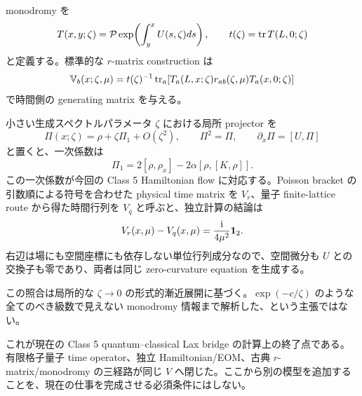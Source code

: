monodromy を
\begin{equation}
T(x,y;\zeta)=\mathcal P\exp\!\left(\int_y^xU(s,\zeta)ds\right),
\qquad t(\zeta)=\operatorname{tr} T(L,0;\zeta)
\label{eq:monodromySTS}
\end{equation}
と定義する。標準的な $r$-matrix construction は
\begin{equation}
\mathbb V_b(x;\zeta,\mu)=t(\zeta)^{-1}\operatorname{tr}_a\!\left[
T_a(L,x;\zeta)r_{ab}(\zeta,\mu)T_a(x,0;\zeta)
\right]
\label{eq:STSformula}
\end{equation}
で時間側の generating matrix を与える\cite{DoikouKaraiskos2011}。

小さい生成スペクトルパラメータ $\zeta$ における局所 projector を
\begin{equation}
\Pi(x;\zeta)=\rho+\zeta\Pi_1+O(\zeta^2),
\qquad \Pi^2=\Pi,
\qquad \partial_x\Pi=[U,\Pi]
\label{eq:PiexpMain}
\end{equation}
と置くと、一次係数は
\begin{equation}
\Pi_1=2[\rho,\rho_x]-2\alpha[\rho,[K,\rho]].
\label{eq:Pi1Main}
\end{equation}
この一次係数が今回の Class 5 Hamiltonian flow に対応する。Poisson bracket の引数順による符号を合わせた physical time matrix を $V_r$、量子 finite-lattice route から得た時間行列を $V_q$ と呼ぶと、独立計算の結論は
\begin{equation}
V_r(x,\mu)-V_q(x,\mu)=\frac{\mathrm i}{4\mu^2}\mathbf 1_{2}.
\label{eq:VrVq}
\end{equation}
右辺は場にも空間座標にも依存しない単位行列成分なので、空間微分も $U$ との交換子も零であり、両者は同じ zero-curvature equation を生成する。

この照合は局所的な $\zeta\to0$ の形式的漸近展開に基づく。$\exp(-c/\zeta)$ のような全てのべき級数で見えない monodromy 情報まで解析した、という主張ではない。

\begin{historymemo}
これが現在の Class 5 quantum--classical Lax bridge の計算上の終了点である。有限格子量子 time operator、独立 Hamiltonian/EOM、古典 $r$-matrix/monodromy の三経路が同じ $V$ へ閉じた。ここから別の模型を追加することを、現在の仕事を完成させる必須条件にはしない。
\end{historymemo}

